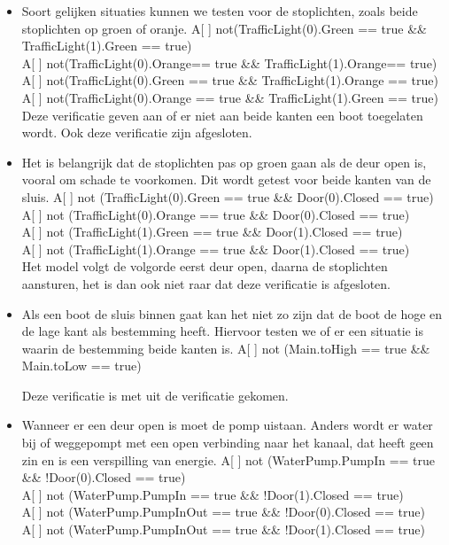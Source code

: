 \documentclass{article}
\begin{document}
\begin{itemize}
\item Soort gelijken situaties kunnen we testen voor de stoplichten, zoals beide stoplichten op groen of oranje.
{\center
A[ ] not(TrafficLight(0).Green == true \&\& TrafficLight(1).Green == true)\\
A[ ] not(TrafficLight(0).Orange== true \&\& TrafficLight(1).Orange== true)\\

A[ ] not(TrafficLight(0).Green == true \&\& TrafficLight(1).Orange == true)\\
A[ ] not(TrafficLight(0).Orange == true \&\& TrafficLight(1).Green == true)\\
}
\vskip0.3cm
Deze verificatie geven aan of er niet aan beide kanten een boot toegelaten wordt. Ook deze verificatie zijn {\color{green}{groen}} afgesloten.


\item Het is belangrijk dat de stoplichten pas op groen gaan als de deur open is, vooral om schade te voorkomen. Dit wordt getest voor beide kanten van de sluis.
{\center
A[ ] not (TrafficLight(0).Green == true \&\& Door(0).Closed == true)\\
A[ ] not (TrafficLight(0).Orange == true \&\& Door(0).Closed == true)\\
\vskip0.1cm
A[ ] not (TrafficLight(1).Green == true \&\& Door(1).Closed == true)\\
A[ ] not (TrafficLight(1).Orange == true \&\& Door(1).Closed == true)\\
}
Het model volgt de volgorde eerst deur open, daarna de stoplichten aansturen, het is dan ook niet raar dat deze verificatie {\color{green}{groen}} is afgesloten.


\item Als een boot de sluis binnen gaat kan het niet zo zijn dat de boot de hoge en de lage kant als bestemming heeft. Hiervoor testen we of er een situatie is waarin de bestemming beide kanten is.
{\center
A[ ] not (Main.toHigh == true \&\& Main.toLow == true)\\
}


Deze verificatie is met {\color{green}{groen}} uit de verificatie gekomen.


\item Wanneer er een deur open is moet de pomp uistaan. Anders wordt er water bij of weggepompt met een open verbinding naar het kanaal, dat heeft geen zin en is een verspilling van energie.
{\center
A[ ] not (WaterPump.PumpIn == true \&\& !Door(0).Closed == true)\\
A[ ] not (WaterPump.PumpIn == true \&\& !Door(1).Closed == true)\\
\vskip0.1cm
A[ ] not (WaterPump.PumpInOut == true \&\& !Door(0).Closed == true)\\
A[ ] not (WaterPump.PumpInOut == true \&\& !Door(1).Closed == true)\\
}



\end{itemize}
\end{document}
